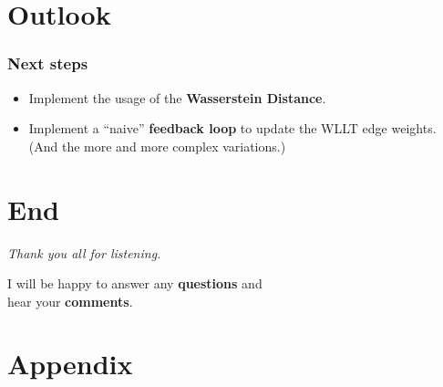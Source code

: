 \section{Outlook}

\begin{frame}
	\frametitle{Next steps}
	\begin{itemize}
		\item Implement the usage of the \textbf{Wasserstein Distance}.
		\newline
		\item Implement a \enquote{naive} \textbf{feedback loop} to update the WLLT edge weights.\\
		(And the more and more complex variations.)
	\end{itemize}	
\end{frame}

\section{End}

\begin{frame}[c]
	\centering %
	\begin{huge}
		\emph{Thank you all for listening.}\\
	\end{huge}
	\vspace{2 cm}
	I will be happy to answer any \textbf{questions} and\\
	hear your \textbf{comments}.
\end{frame}

\appendix
\section{Appendix}

